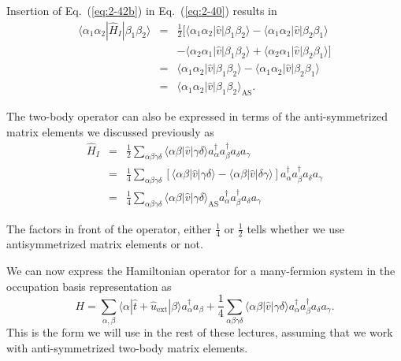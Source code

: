 \documentclass[graybox,sectrefs,envcountresetchap,open=right]{svmonodo}
\begin{document}
Insertion of 
Eq.~(\ref{eq:2-42b}) in Eq.~(\ref{eq:2-40}) results in
\begin{eqnarray}
	\langle \alpha_1\alpha_2|\hat{H}_I|\beta_1\beta_2\rangle &=& \frac{1}{2} \big[ 
		\langle \alpha_1\alpha_2|\hat{v}|\beta_1\beta_2\rangle- \langle \alpha_1\alpha_2|\hat{v}|\beta_2\beta_1\rangle \nonumber \\
		&& - \langle \alpha_2\alpha_1|\hat{v}|\beta_1\beta_2\rangle + \langle \alpha_2\alpha_1|\hat{v}|\beta_2\beta_1\rangle \big] \nonumber \\
	&=& \langle \alpha_1\alpha_2|\hat{v}|\beta_1\beta_2\rangle - \langle \alpha_1\alpha_2|\hat{v}|\beta_2\beta_1\rangle \nonumber \\
	&=& \langle \alpha_1\alpha_2|\hat{v}|\beta_1\beta_2\rangle_{\mathrm{AS}}. \label{eq:2-43b}
\end{eqnarray}







The two-body operator can also be expressed in terms of the anti-symmetrized matrix elements we discussed previously as
\begin{eqnarray}
	\hat{H}_I &=& \frac{1}{2} \sum_{\alpha\beta\gamma\delta}  \langle \alpha \beta|\hat{v}|\gamma \delta\rangle
		a_\alpha^{\dagger} a_\beta^{\dagger} a_\delta a_\gamma \nonumber \\
	&=& \frac{1}{4} \sum_{\alpha\beta\gamma\delta} \left[ \langle \alpha \beta|\hat{v}|\gamma \delta\rangle -
		\langle \alpha \beta|\hat{v}|\delta\gamma \rangle \right] 
		a_\alpha^{\dagger} a_\beta^{\dagger} a_\delta a_\gamma \nonumber \\
	&=& \frac{1}{4} \sum_{\alpha\beta\gamma\delta} \langle \alpha \beta|\hat{v}|\gamma \delta\rangle_{\mathrm{AS}}
		a_\alpha^{\dagger} a_\beta^{\dagger} a_\delta a_\gamma \label{eq:2-45}
\end{eqnarray}





The factors in front of the operator, either  $\frac{1}{4}$ or 
$\frac{1}{2}$ tells whether we use antisymmetrized matrix elements or not. 

We can now express the Hamiltonian operator for a many-fermion system  in the occupation basis representation
as  
\begin{equation}
	H = \sum_{\alpha, \beta} \langle \alpha|\hat{t}+\hat{u}_{\mathrm{ext}}|\beta\rangle a_\alpha^{\dagger} a_\beta + \frac{1}{4} \sum_{\alpha\beta\gamma\delta}
		\langle \alpha \beta|\hat{v}|\gamma \delta\rangle a_\alpha^{\dagger} a_\beta^{\dagger} a_\delta a_\gamma. \label{eq:2-46b}
\end{equation}
This is the form we will use in the rest of these lectures, assuming that we work with anti-symmetrized two-body matrix elements.
\end{document}
